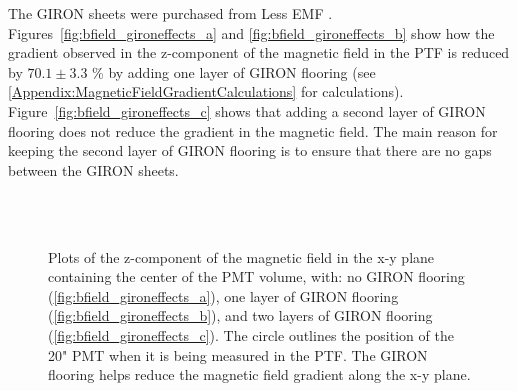The GIRON sheets were purchased from Less EMF \cite{lessemf}. Figures~\ref{fig:bfield_gironeffects_a} and \ref{fig:bfield_gironeffects_b} show how the gradient observed in the z-component of the magnetic field in the PTF is reduced by $ 70.1\pm3.3 $ \% by adding one layer of GIRON flooring (see \ref{Appendix:MagneticFieldGradientCalculations} for calculations).
Figure~\ref{fig:bfield_gironeffects_c} shows that adding a second layer of GIRON flooring does not reduce the gradient in the magnetic field. The main reason for keeping the second layer of GIRON flooring is to ensure that there are no gaps between the GIRON sheets.
%
\begin{figure}[htbp]
  \begin{center}
    \vspace{-10 mm}
    \\
    \vspace{-3 mm}
    \\
    \vspace{-3 mm}
  \caption{Plots of the z-component of the magnetic field in the x-y plane containing the center of the PMT volume, with: no GIRON flooring (\ref{fig:bfield_gironeffects_a}), one layer of GIRON flooring (\ref{fig:bfield_gironeffects_b}), and two layers of GIRON flooring (\ref{fig:bfield_gironeffects_c}). The circle outlines the position of the 20" PMT when it is being measured in the PTF. The GIRON flooring helps reduce the magnetic field gradient along the x-y plane.}
  \label{fig:bfield_gironeffects}
  \end{center}
\end{figure}
%

